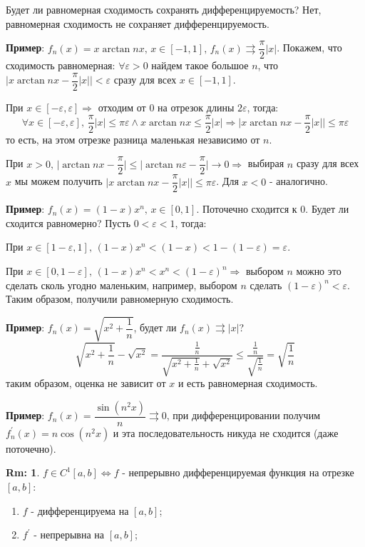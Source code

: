 \documentclass[12pt]{article}
\newcommand{\VE}{\varepsilon}
\theoremstyle{definition}
\newtheorem{rem}{Rm:}
\begin{document}
\newpage
Будет ли равномерная сходимость сохранять дифференцируемость? Нет, равномерная сходимость не сохраняет дифференцируемость.

\textbf{Пример}: $f_n(x) = x \arctan{nx}, \, x \in [-1,1], \, f_n(x) \rightrightarrows \dfrac{\pi}{2}|x|$. Покажем, что сходимость равномерная: $\forall \VE > 0$ найдем такое большое $n$, что $\Big|x \arctan{nx} - \dfrac{\pi}{2}|x| \Big| < \VE$ сразу для всех $x \in [-1,1]$.
 
При $x \in [-\VE, \VE] \Rightarrow$ отходим от $0$ на отрезок длины $2\VE$, тогда: 
$$\forall x \in [-\VE,\VE], \, \dfrac{\pi}{2}|x| \leq \pi \VE \wedge x\arctan{nx} \leq \dfrac{\pi}{2}|x| \Rightarrow \Big|x \arctan{nx} - \dfrac{\pi}{2}|x| \Big| \leq \pi\VE$$
то есть, на этом отрезке разница маленькая независимо от $n$.

При $x > 0, \, \Big|\arctan{nx} - \dfrac{\pi}{2}\Big| \leq \Big|\arctan{n\VE} - \dfrac{\pi}{2}\Big| \to 0 \Rightarrow$ выбирая $n$ сразу для всех $x$ мы можем получить $\Big|x \arctan{nx} - \dfrac{\pi}{2}|x| \Big| \leq \pi\VE$. Для $x < 0$ - аналогично.

\textbf{Пример}: $f_n(x) = (1-x)x^n, \, x \in [0,1]$. Поточечно сходится к $0$. Будет ли сходится равномерно? Пусть $0 < \VE < 1$, тогда:

При $x \in [1-\VE,1],\, (1-x)x^n < (1 - x) <  1 - (1-\VE) = \VE$.

При $x \in [0,1-\VE],\, (1-x)x^n < x^n < (1-\VE)^n \Rightarrow$ выбором $n$ можно это сделать сколь угодно маленьким, например, выбором $n$ сделать $(1-\VE)^n < \VE$. Таким образом, получили равномерную сходимость.

\textbf{Пример}: $f_n(x) = \sqrt{x^2 + \dfrac{1}{n}}$, будет ли $f_n(x) \rightrightarrows |x|$?
$$
	\sqrt{x^2 + \dfrac{1}{n}} - \sqrt{x^2}  = \dfrac{\tfrac{1}{n}}{\sqrt{x^2 + \tfrac{1}{n}} + 	\sqrt{x^2}} \leq \dfrac{\tfrac{1}{n}}{\sqrt{\tfrac{1}{n}}} = \sqrt{\dfrac{1}{n}}
$$
таким образом, оценка не зависит от $x$ и есть равномерная сходимость.

\textbf{Пример}: $f_n(x) = \dfrac{\sin{(n^2x)}}{n} \rightrightarrows 0$, при дифференцировании получим $f_n^\prime(x) = n \cos{(n^2x)}$ и эта последовательность никуда не сходится (даже поточечно).

\begin{rem}
	$f \in C^1[a,b] \Leftrightarrow f$ - непрерывно дифференцируемая функция на отрезке $[a,b]$:
	\begin{enumerate}[label ={(\arabic*)}]
		\item $f$ - дифференцируема на $[a,b]$;
		\item $f^\prime$ - непрерывна на $[a,b]$;
	\end{enumerate}
\end{rem}
\end{document}

